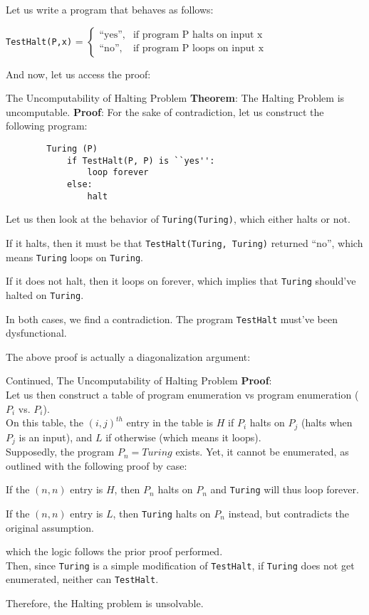 Let us write a program that behaves as follows:
\begin{center}
    \verb+TestHalt(P,x)+ = $
    \begin{cases}
        \text{``yes''}, &\text{if program P halts on input x} \\
        \text{``no''}, &\text{if program P loops on input x}
    \end{cases} $
\end{center}
And now, let us access the proof:
\begin{ln-theorem}{The Uncomputability of Halting Problem}{}
    \textbf{Theorem}: The Halting Problem is uncomputable.
    \tcblower
    \textbf{Proof}: For the sake of contradiction, let us construct the following program:
    \begin{verbatim}
        Turing (P)
            if TestHalt(P, P) is ``yes'':
                loop forever
            else:
                halt
    \end{verbatim}
    Let us then look at the behavior of \verb+Turing(Turing)+, which either halts or not.
    \begin{bindenum}
        \item If it halts, then it must be that \verb+TestHalt(Turing, Turing)+ returned ``no'', which means \verb+Turing+ loops on \verb+Turing+.
        \item If it does not halt, then it loops on forever, which implies that \verb+Turing+ should've halted on \verb+Turing+.
    \end{bindenum}
    In both cases, we find a contradiction. The program \verb+TestHalt+ must've been dysfunctional.
\end{ln-theorem}

The above proof is actually a diagonalization argument:
\begin{ln-theorem}{Continued, The Uncomputability of Halting Problem}{}
    \textbf{Proof}: \\
    Let us then construct a table of program enumeration vs program enumeration ($P_i$ vs. $P_i$). \\
    On this table, the ${(i, j)}^{th}$ entry in the table is $H$ if $P_i$ halts on $P_j$ (halts when $P_j$ is an input), and $L$ if otherwise (which means it loops). \\
    Supposedly, the program $P_n = Turing$ exists. Yet, it cannot be enumerated, as outlined with the following proof by case:
    \begin{bindenum}
        \item If the $(n, n)$ entry is $H$, then $P_n$ halts on $P_n$ and \verb+Turing+ will thus loop forever.
        \item If the $(n, n)$ entry is $L$, then \verb+Turing+ halts on $P_n$ instead, but contradicts the original assumption.
    \end{bindenum}
    which the logic follows the prior proof performed. \\
    
    Then, since \verb+Turing+ is a simple modification of \verb+TestHalt+, if \verb+Turing+ does not get enumerated, neither can \verb+TestHalt+.
\end{ln-theorem}
Therefore, the Halting problem is unsolvable.

